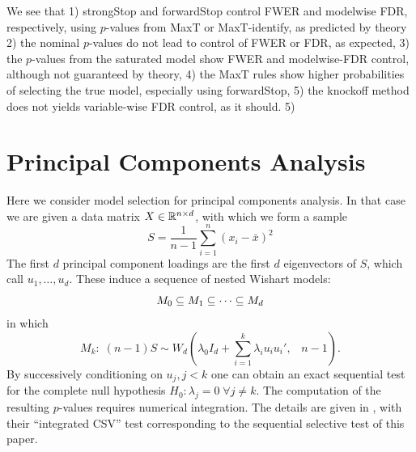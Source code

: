 \documentclass{article}
\begin{document}
We see that 1) strongStop and forwardStop control FWER and modelwise FDR, respectively, using $p$-values from MaxT or MaxT-identify, as predicted by theory
2) the nominal $p$-values do not lead to control of FWER or FDR, as expected, 3) the $p$-values from the saturated model show FWER and modelwise-FDR control,
although not guaranteed by theory, 4) the MaxT rules show higher probabilities of selecting the true model, especially using forwardStop, 5) the knockoff method
does not yields variable-wise FDR control, as it should.
5)
\section{Principal Components Analysis}
\label{sec:pca}


Here we consider model selection for principal components analysis. In that case we are given a data matrix $X \in \mathbb{R}^{n\times d}$, with which we form a sample %
\[
S = \frac{1}{n-1} \sum_{i=1}^n(x_i - \bar x)^2
\]
The first $d$ principal component loadings are the first $d$ eigenvectors of $S$, which call $u_1,\ldots, u_d$. These induce a sequence of nested Wishart models:
\[
M_0 \subseteq M_1 \subseteq \cdots \subseteq M_d
\]
in which
\begin{equation}
  M_k:\; (n-1) S \sim W_d\left(\lambda_0 I_d + \sum_{i=1}^k     \lambda_i u_i u_i', \;\;\; n-1\right).
\end{equation}
 By successively conditioning on $u_j, j<k$ one can obtain an exact sequential test
for the complete null hypothesis $H_0: \lambda_j=0 \; \forall j \neq k$.  The computation of the resulting $p$-values requires numerical integration.
The details are given in \citet{choi2014selecting}, with their ``integrated CSV'' test  corresponding to the sequential selective test of this paper.

\end{document}
